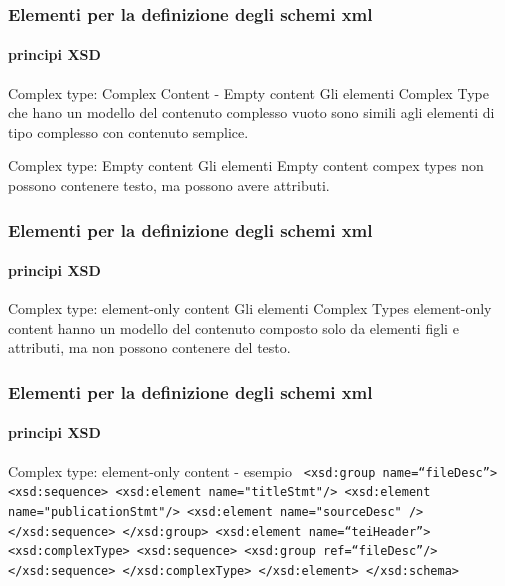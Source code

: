 \begin{frame}
	\frametitle{Elementi per la definizione degli schemi xml}
	\framesubtitle{principi XSD}
	\addtocounter{nframe}{1}

	\begin{block}{Complex type: Complex Content - Empty content}
		Gli elementi Complex Type che hano un modello del contenuto complesso vuoto sono simili agli elementi di tipo complesso con contenuto semplice.
	\end{block}

	\begin{block}{Complex type: Empty content}
		Gli elementi Empty content compex types non possono contenere testo, ma possono avere attributi.
	\end{block}
\end{frame}



\begin{frame}
	\frametitle{Elementi per la definizione degli schemi xml}
	\framesubtitle{principi XSD}
	\addtocounter{nframe}{1}

	\begin{block}{Complex type: element-only content}
		Gli elementi  Complex Types element-only content hanno un modello del contenuto composto solo da elementi figli e attributi, ma non possono contenere del testo.
	\end{block}
\end{frame}



\begin{frame}
	\frametitle{Elementi per la definizione degli schemi xml}
	\framesubtitle{principi XSD}
	\addtocounter{nframe}{1}

	\begin{block}{Complex type: element-only content - esempio}
		\texttt{
			<xsd:group name=``fileDesc''>
			<xsd:sequence>
			<xsd:element name="titleStmt"/>
			<xsd:element name="publicationStmt"/>
			<xsd:element name="sourceDesc" />
			</xsd:sequence>
			</xsd:group>
			<xsd:element name=``teiHeader''>
			<xsd:complexType>
			<xsd:sequence>
			<xsd:group ref=``fileDesc''/>
			</xsd:sequence>
			</xsd:complexType>
			</xsd:element>
			</xsd:schema>
		}
	\end{block}
\end{frame}

